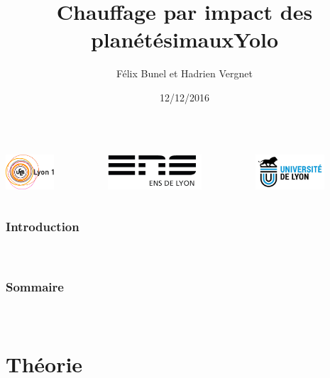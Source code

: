 \documentclass{beamer}
\title{Chauffage par impact des planétésimaux}
\author{Félix Bunel et Hadrien Vergnet}
\date{12/12/2016}
\begin{document}

\begin{frame}[plain]

\begin{columns}
\begin{column}{3.3cm}
\center
   \includegraphics[height=1.3cm]{figures/logo_lyon1.jpg}
\end{column}
\begin{column}{3.3cm}
\center
\includegraphics[height=1.3cm]{figures/logo_ens.jpg}
\end{column}
\begin{column}{3.3cm}
\center
\includegraphics[height=1.3cm]{figures/logo_univ_lyon.jpg}
\end{column}
\end{columns}

\titlepage
\end{frame}

\title{Yolo}
\begin{frame}
\frametitle{Introduction}
\framesubtitle{\ }

\end{frame}


\begin{frame}
	\frametitle{Sommaire}
	\framesubtitle{\ }
	\tableofcontents
\end{frame}

\section{Théorie}
\end{document}
